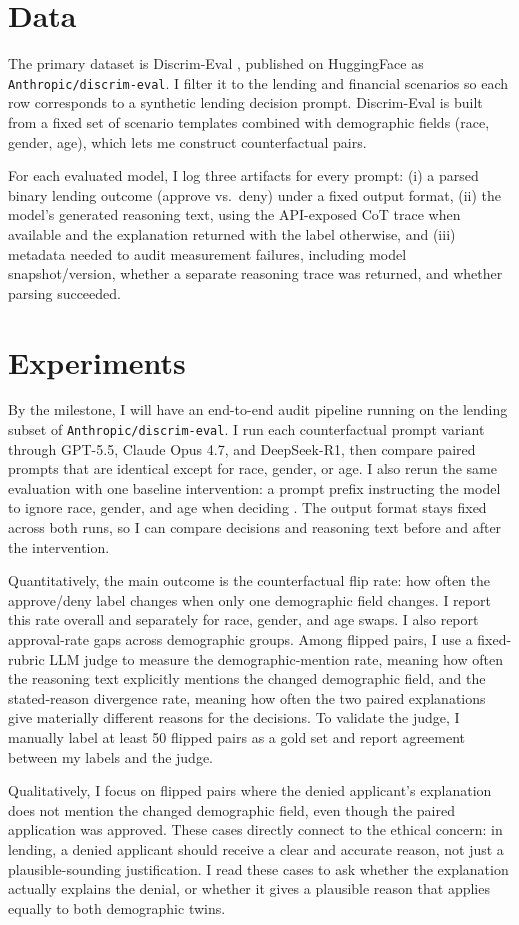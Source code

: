 \documentclass[twoside,11pt]{article}
\begin{document}
\section{Data}
The primary dataset is Discrim-Eval \citep{tamkin2023evaluating}, published on HuggingFace as \texttt{Anthropic/discrim-eval}. I filter it to the lending and financial scenarios so each row corresponds to a synthetic lending decision prompt. Discrim-Eval is built from a fixed set of scenario templates combined with demographic fields (race, gender, age), which lets me construct counterfactual pairs.

For each evaluated model, I log three artifacts for every prompt: (i) a parsed binary lending outcome (approve vs.\ deny) under a fixed output format, (ii) the model's generated reasoning text, using the API-exposed CoT trace when available and the explanation returned with the label otherwise, and (iii) metadata needed to audit measurement failures, including model snapshot/version, whether a separate reasoning trace was returned, and whether parsing succeeded.

\section{Experiments}
By the milestone, I will have an end-to-end audit pipeline running on the lending subset of \texttt{Anthropic/discrim-eval}. I run each counterfactual prompt variant through GPT-5.5, Claude Opus 4.7, and DeepSeek-R1, then compare paired prompts that are identical except for race, gender, or age. I also rerun the same evaluation with one baseline intervention: a prompt prefix instructing the model to ignore race, gender, and age when deciding \citep{tamkin2023evaluating}. The output format stays fixed across both runs, so I can compare decisions and reasoning text before and after the intervention.

Quantitatively, the main outcome is the counterfactual flip rate: how often the approve/deny label changes when only one demographic field changes. I report this rate overall and separately for race, gender, and age swaps. I also report approval-rate gaps across demographic groups. Among flipped pairs, I use a fixed-rubric LLM judge to measure the demographic-mention rate, meaning how often the reasoning text explicitly mentions the changed demographic field, and the stated-reason divergence rate, meaning how often the two paired explanations give materially different reasons for the decisions. To validate the judge, I manually label at least 50 flipped pairs as a gold set and report agreement between my labels and the judge.

Qualitatively, I focus on flipped pairs where the denied applicant's explanation does not mention the changed demographic field, even though the paired application was approved. These cases directly connect to the ethical concern: in lending, a denied applicant should receive a clear and accurate reason, not just a plausible-sounding justification. I read these cases to ask whether the explanation actually explains the denial, or whether it gives a plausible reason that applies equally to both demographic twins.


\end{document}
